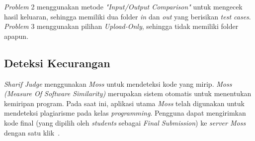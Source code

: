 \textit{Problem} 2 menggunakan metode \textit{"Input/Output Comparison"} untuk mengecek hasil keluaran, sehingga memiliki dua folder \textit{in} dan \textit{out} yang berisikan \textit{test cases}. \textit{Problem} 3 menggunakan pilihan \textit{Upload-Only}, sehingga tidak memiliki folder apapun.

\subsection{Deteksi Kecurangan}
\textit{Sharif Judge} menggunakan \textit{Moss} untuk mendeteksi kode yang mirip. \textit{Moss (Measure Of Software Similarity)} merupakan sistem otomatis untuk menentukan kemiripan program. Pada saat ini, aplikasi utama \textit{Moss} telah digunakan untuk mendeteksi plagiarisme pada kelas \textit{programming}. Pengguna dapat mengirimkan kode final (yang dipilih oleh \textit{students} sebagai \textit{Final Submission}) ke \textit{server Moss} dengan satu klik~\cite{mjnaderi:14:sharifjudgedoc}.\\

